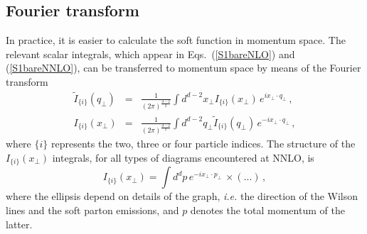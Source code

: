 \documentclass[a4paper,11pt]{article}
\newcommand{\ie}{{\it i.e. }}
\numberwithin{equation}{section}
\begin{document}
\subsection{Fourier transform}

In practice, it is easier to calculate the soft function in momentum space. The
relevant scalar integrals, which appear in Eqs.~(\ref{S1bareNLO}) and
(\ref{S1bareNNLO}), can be transferred to momentum space by means of the Fourier
transform 
%
\begin{subequations}
   \begin{eqnarray}
     \label{eq:fourier-transformd}
     \tilde I_{\{i\}} (q_\perp)& = &
     \frac{1}{\left(2\pi\right)^{\frac{d-2}{2}}}
     \int d^{d-2} x_\perp I_{\{i\}} (x_\perp) \, e^{i x_\perp \cdot q_\perp}\,,
     \\
     \label{eq:fourier-transform-inv}
     I_{\{i\}} (x_\perp)& = &
     \frac{1}{\left(2\pi\right)^{\frac{d-2}{2}}}
     \int d^{d-2} q_\perp \tilde I_{\{i\}} (q_\perp) \, e^{-i x_\perp \cdot
     q_\perp}\,,
   \end{eqnarray}
\end{subequations}
%
where $\{i\}$ represents the two, three or four particle indices.
%
The structure of the $I_{\{i\}}(x_\perp)$ integrals, for all types of diagrams
encountered at NNLO, is
%
\begin{equation}
  I_{\{i\}}(x_\perp) = 
\int d^d p
  \, e^{-i x_\perp \cdot p_\perp}\,
  \times (...)\,,
  \label{eq:Igenform}
\end{equation}
%
where the ellipsis depend on details of the graph, \ie the direction of the
Wilson lines and the soft parton emissions, and $p$ denotes the total momentum
of the latter.
\end{document}
